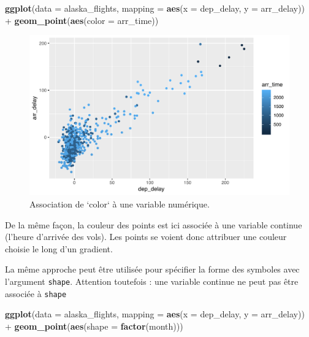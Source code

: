 \documentclass[a4paperpaper,]{article}
\newenvironment{Shaded}{\begin{snugshade}}{\end{snugshade}}
\newcommand{\DataTypeTok}[1]{\textcolor[rgb]{0.00,0.34,0.68}{#1}}
\newcommand{\KeywordTok}[1]{\textcolor[rgb]{0.12,0.11,0.11}{\textbf{#1}}}
\newcommand{\NormalTok}[1]{\textcolor[rgb]{0.12,0.11,0.11}{#1}}
\newcommand{\OperatorTok}[1]{\textcolor[rgb]{0.12,0.11,0.11}{#1}}
\newcommand{\StringTok}[1]{\textcolor[rgb]{0.75,0.01,0.01}{#1}}
\begin{document}
\begin{Shaded}
\begin{Highlighting}[]
\KeywordTok{ggplot}\NormalTok{(}\DataTypeTok{data =}\NormalTok{ alaska_flights, }\DataTypeTok{mapping =} \KeywordTok{aes}\NormalTok{(}\DataTypeTok{x =}\NormalTok{ dep_delay, }\DataTypeTok{y =}\NormalTok{ arr_delay)) }\OperatorTok{+}
\StringTok{  }\KeywordTok{geom_point}\NormalTok{(}\KeywordTok{aes}\NormalTok{(}\DataTypeTok{color =}\NormalTok{ arr_time))}
\end{Highlighting}
\end{Shaded}

\begin{figure}[htpb]

{\centering \includegraphics[width=0.9\linewidth]{figure/varcolor2-1} 

}

\caption{Association de `color` à une variable numérique.}\label{fig:varcolor2}
\end{figure}

De la même façon, la couleur des points est ici associée à une variable continue (l'heure d'arrivée des vols). Les points se voient donc attribuer une couleur choisie le long d'un gradient.

La même approche peut être utilisée pour spécifier la forme des symboles avec l'argument \texttt{shape}. Attention toutefois : une variable continue ne peut pas être associée à \texttt{shape}

\begin{Shaded}
\begin{Highlighting}[]
\KeywordTok{ggplot}\NormalTok{(}\DataTypeTok{data =}\NormalTok{ alaska_flights, }\DataTypeTok{mapping =} \KeywordTok{aes}\NormalTok{(}\DataTypeTok{x =}\NormalTok{ dep_delay, }\DataTypeTok{y =}\NormalTok{ arr_delay)) }\OperatorTok{+}
\StringTok{  }\KeywordTok{geom_point}\NormalTok{(}\KeywordTok{aes}\NormalTok{(}\DataTypeTok{shape =} \KeywordTok{factor}\NormalTok{(month)))}
\end{Highlighting}
\end{Shaded}
\end{document}
